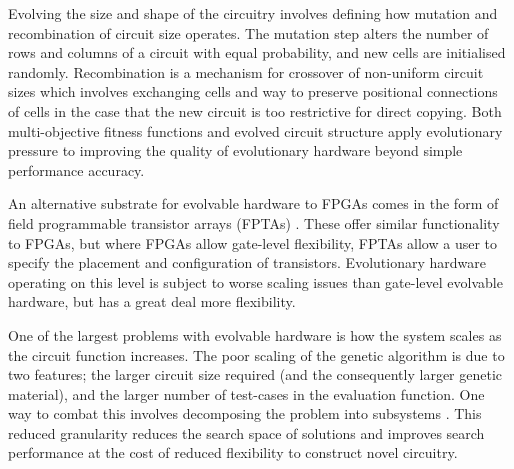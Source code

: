 Evolving the size and shape of the circuitry involves defining how mutation and recombination
of circuit size operates. The mutation step alters the number of rows and columns of a circuit
with equal probability, and new cells are initialised randomly. Recombination is a
mechanism for crossover of non-uniform circuit sizes which involves exchanging cells
and way to preserve positional connections of cells in the case that the new circuit
is too restrictive for direct copying.
Both multi-objective fitness functions and evolved circuit structure
apply evolutionary pressure to improving the quality of evolutionary hardware
beyond simple performance accuracy.

An alternative substrate for evolvable hardware to FPGAs comes in the form of field
programmable transistor arrays (FPTAs) \cite{869347}. These offer similar functionality
to FPGAs, but where FPGAs allow gate-level flexibility, FPTAs allow a user to specify
the placement and configuration of transistors. Evolutionary hardware operating on this
level is subject to worse scaling issues than gate-level evolvable hardware, but has a
great deal more flexibility.

One of the largest problems with evolvable hardware is how the system scales as the
circuit function increases. The poor scaling of the genetic algorithm is due to two
features; the larger circuit size required (and the consequently larger genetic material),
and the larger number of test-cases in the evaluation function. One way to combat this
involves decomposing the problem into subsystems \cite{10.1007/978-3-540-46239-2_5}.
This reduced granularity reduces the search space of solutions and improves search
performance at the cost of reduced flexibility to construct novel circuitry.

